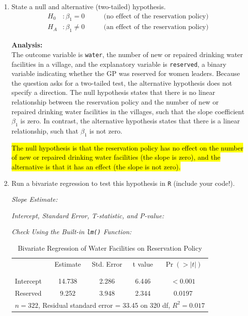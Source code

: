 \documentclass[12pt,letterpaper]{article}
\begin{document}
\begin{enumerate}
	
	\item [(a)] State a null and alternative (two-tailed) hypothesis. \\
	
	\[
	\begin{aligned}
		H_0 &: \beta_1 = 0 &\qquad \text{(no effect of the reservation policy)} \\
		H_A &: \beta_1 \neq 0 &\qquad \text{(an effect of the reservation policy)}
	\end{aligned}
	\]
	
	\textbf{Analysis:}\\
	The outcome variable is \texttt{water}, the number of new or repaired drinking water facilities in a village, and the explanatory variable is \texttt{reserved}, a binary variable indicating whether the GP was reserved for women leaders. Because the question asks for a two-tailed test, the alternative hypothesis does not specify a direction. The null hypothesis states that there is no linear relationship between the reservation policy and the number of new or repaired drinking water facilities in the villages, such that the slope coefficient $\beta_1$ is zero. In contrast, the alternative hypothesis states that there is a linear relationship, such that $\beta_1$ is not zero.
	
	\hl{The null hypothesis is that the reservation policy has no effect on the number of new or repaired drinking water facilities (the slope is zero), and the alternative is that it has an effect (the slope is not zero).}
	
	\vspace{.5cm}
	
	\item [(b)] Run a bivariate regression to test this hypothesis in \texttt{R} (include your code!).
	
	\textit{Slope Estimate:}
	
	
	\textit{Intercept, Standard Error, T-statistic, and P-value:}
	
	
	\textit{Check Using the Built-in \texttt{lm()} Function:}
	
	
	\begin{table}[H]
		\centering
		\caption{\footnotesize Bivariate Regression of Water Facilities on Reservation Policy}
		\begin{tabular}{l | c c c c}
			& Estimate & Std. Error & t value & $\Pr(>|t|)$ \\
			\\[-1.8ex] 
			\hline \\[-1.8ex]
			Intercept & 14.738 & 2.286 & 6.446 & $<0.001$ \\
			Reserved & 9.252 & 3.948 & 2.344 & 0.0197 \\
			\hline
			\multicolumn{5}{l}{\footnotesize $n = 322$, \; Residual standard error = 33.45 on 320 df, \; $R^2 = 0.017$}
		\end{tabular}
	\end{table}
	

\end{enumerate}
\end{document}
